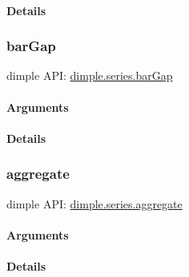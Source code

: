 \documentclass[letterpaper,10pt,english]{sphinxmanual}
\begin{document}
\paragraph{Details}
\label{dimple/api:id9}

\subsubsection{barGap}
\label{dimple/api:bargap}
dimple API: \href{https://github.com/PMSI-AlignAlytics/dimple/wiki/dimple.series\#barGap}{dimple.series.barGap}


\paragraph{Arguments}
\label{dimple/api:id10}

\paragraph{Details}
\label{dimple/api:id11}

\subsubsection{aggregate}
\label{dimple/api:aggregate}
dimple API: \href{https://github.com/PMSI-AlignAlytics/dimple/wiki/dimple.series\#aggregate}{dimple.series.aggregate}


\paragraph{Arguments}
\label{dimple/api:id12}

\paragraph{Details}
\label{dimple/api:id13}
\end{document}
